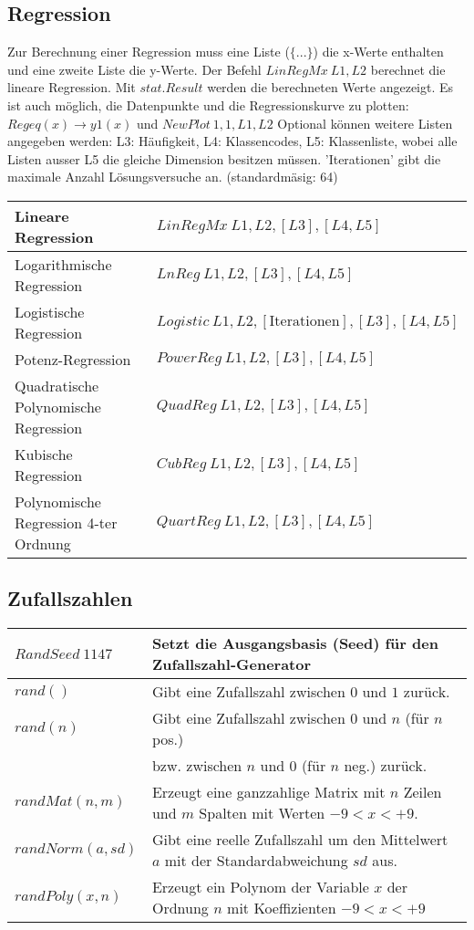 \subsection{Regression}
Zur Berechnung einer Regression muss eine Liste ($\{...\}$) die x-Werte enthalten 
und eine zweite Liste die y-Werte. Der Befehl $LinRegMx \: L1,L2$ berechnet die lineare 
Regression. Mit $stat.Result$ werden die berechneten Werte angezeigt. 
Es ist auch möglich, die Datenpunkte und die Regressionskurve zu plotten: 
$Regeq(x) \to y1(x)$ und $NewPlot \: 1,1,L1,L2$ Optional können weitere Listen 
angegeben werden: L3: Häufigkeit, L4: Klassencodes,  L5: Klassenliste, wobei alle Listen ausser 
L5 die gleiche Dimension besitzen müssen. 'Iterationen' gibt die maximale Anzahl Lösungsversuche an. 
(standardmäsig: 64)\\

\begin{tabular}{|l|l|}
	\hline
	Lineare Regression						&	$LinRegMx \: L1,L2,[L3],[L4,L5]$ \\ \hline
	Logarithmische Regression				&	$LnReg \: L1,L2,[L3],[L4,L5]$ \\ \hline
	Logistische Regression					&	$Logistic \: L1,L2,[\text{Iterationen}],[L3],[L4,L5]$\\ \hline
	Potenz-Regression						&	$PowerReg \: L1,L2,[L3],[L4,L5]$ \\ \hline
	Quadratische Polynomische Regression	&	$QuadReg \: L1,L2,[L3],[L4,L5]$ \\ \hline
	Kubische Regression						&	$CubReg \: L1,L2,[L3],[L4,L5]$ \\ \hline
	Polynomische Regression 4-ter Ordnung	&	$QuartReg \: L1,L2,[L3],[L4,L5]$ \\ \hline
\end{tabular}

\subsection{Zufallszahlen}
\begin{tabular}{|l|l|}
	\hline
	$RandSeed \: 1147$					& Setzt die Ausgangsbasis (Seed) für den Zufallszahl-Generator \\ \hline
	$rand()$							& Gibt eine Zufallszahl zwischen $0$ und $1$ zurück. \\
	$rand(n)$							& Gibt eine Zufallszahl zwischen $0$ und $n$ (für $n$ pos.) \\ 
										& bzw. zwischen $n$ und $0$ (für $n$ neg.) zurück. \\ \hline
	$randMat(n,m)$						& Erzeugt eine ganzzahlige Matrix mit $n$ Zeilen und $m$ Spalten mit Werten $-9<x<+9$. \\ \hline
	$randNorm(a,sd)$					& Gibt eine reelle Zufallszahl um den Mittelwert $a$ mit der Standardabweichung $sd$ aus. \\ \hline
	$randPoly(x,n)$						& Erzeugt ein Polynom der Variable $x$ der Ordnung $n$ mit Koeffizienten $-9<x<+9$ \\ \hline
\end{tabular}
